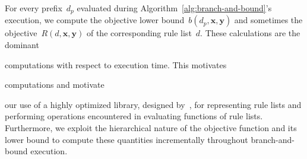 \documentclass[twoside,11pt]{article}
\newcommand{\x}{\mathbf{x}}
\newcommand{\y}{\mathbf{y}}
\def\RL{{d}}
\def\Prefix{d_p}
\def\Obj{R}
\begin{document}
For every prefix~$\Prefix$ evaluated during
Algorithm~\ref{alg:branch-and-bound}'s execution, we compute
the objective lower bound~${b(\Prefix, \x, \y)}$ and sometimes
the objective~${\Obj(\RL, \x, \y)}$ of the corresponding rule list~$\RL$.
%
These calculations are the dominant
\begin{arxiv}
computations with respect to execution time.
%
This motivates
\end{arxiv}
\begin{kdd}
computations and motivate
\end{kdd}
our use of a highly optimized library,
designed by~\citet{YangRuSe16}, for representing rule lists and
performing operations encountered in evaluating functions of rule lists.
%
Furthermore, we exploit the hierarchical nature of the objective
function and its lower bound to compute these quantities
incrementally throughout branch-and-bound execution.
%
\end{document}

